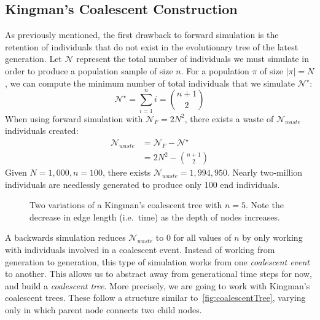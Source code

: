 \subsection{Kingman's Coalescent Construction}\label{subsec:kingmanCoalescentConstruction}
As previously mentioned, the first drawback to forward simulation is the retention of individuals that do not exist in
the evolutionary tree of the latest generation.
Let $\mathcal{N}$ represent the total number of individuals we must simulate in order to produce a population sample of
size $n$.
For a population $\pi$ of size $|\pi| = N$, we can compute the minimum number of total individuals that we simulate
$\mathcal{N}^\star$:
\begin{equation}
    \mathcal{N}^\star = \sum_{i=1}^n i = \binom{n + 1}{2}
\end{equation}
When using forward simulation with $\mathcal{N}_{F} = 2N^2$, there exists a waste of
$\mathcal{N}_{waste}$ individuals created:
\begin{equation}
    \begin{aligned}
        \mathcal{N}_{{waste}} &= \mathcal{N}_{F} - \mathcal{N}^\star \\
        &= 2N^2 - \binom{n + 1}{2}
    \end{aligned}
\end{equation}
Given $N = 1,000, n = 100$, there exists $\mathcal{N}_{waste} = 1,994,950$.
Nearly two-million individuals are needlessly generated to produce only 100 end individuals.

\begin{figure}[t]
    \centering
    \subfloat{}
    \qquad \qquad \qquad
    \subfloat{}
    \caption{Two variations of a Kingman's coalescent tree with $n = 5$.
    Note the decrease in edge length (i.e.\ time) as the depth of nodes increases.}
    \label{fig:coalescentTree}
\end{figure}

A backwards simulation reduces $\mathcal{N}_{waste}$ to 0 for all values of $n$ by only working with individuals
involved in a coalescent event.
Instead of working from generation to generation, this type of simulation works from one \emph{coalescent event} to
another.
This allows us to abstract away from generational time steps for now, and build a \emph{coalescent tree}.
More precisely, we are going to work with Kingman's coalescent trees.
These follow a structure similar to~\autoref{fig:coalescentTree}, varying only in which parent node connects two child
nodes.


